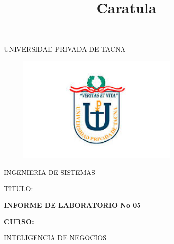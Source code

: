 \documentclass[12pt,letterpaper]{article}
\begin{document}
%


\title{Caratula}

\begin{titlepage}
\begin{center}
\large{UNIVERSIDAD PRIVADA-DE-TACNA}\\
\vspace*{-0.025in}
\begin{figure}[htb]
\begin{center}
\includegraphics[width=8cm]{./Imagenes/logo}
\end{center}
\end{figure}
\vspace*{0.15in}
INGENIERIA DE SISTEMAS  \\

\vspace*{0.5in}
\begin{large}
TITULO:\\
\end{large}

\vspace*{0.1in}
\begin{Large}
\textbf{INFORME DE LABORATORIO No 05} \\
\end{Large}

\vspace*{0.3in}
\begin{Large}
\textbf{CURSO:} \\
\end{Large}

\vspace*{0.1in}
\begin{large}
INTELIGENCIA DE NEGOCIOS\\
\end{large}


\end{center}
\end{titlepage}
\end{document}
